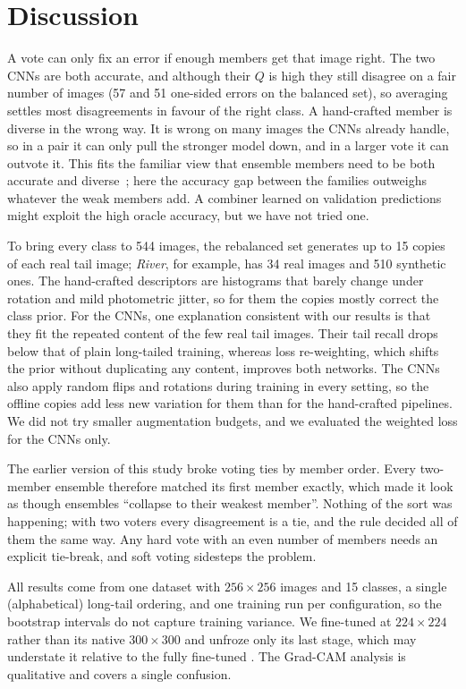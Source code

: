 \section{Discussion}
\label{sec:discussion}

A vote can only fix an error if enough members get that image right.
The two CNNs are both accurate, and although their $Q$ is high they still disagree on a fair number of images (57 and 51 one-sided errors on the balanced set), so averaging settles most disagreements in favour of the right class.
A hand-crafted member is diverse in the wrong way.
It is wrong on many images the CNNs already handle, so in a pair it can only pull the stronger model down, and in a larger vote it can outvote it.
This fits the familiar view that ensemble members need to be both accurate and diverse~\cite{dietterich2000ensemble,kuncheva2003diversity}; here the accuracy gap between the families outweighs whatever the weak members add.
A combiner learned on validation predictions might exploit the high oracle accuracy, but we have not tried one.

To bring every class to 544 images, the rebalanced set generates up to 15 copies of each real tail image; \emph{River}, for example, has 34 real images and 510 synthetic ones.
The hand-crafted descriptors are histograms that barely change under rotation and mild photometric jitter, so for them the copies mostly correct the class prior.
For the CNNs, one explanation consistent with our results is that they fit the repeated content of the few real tail images.
Their tail recall drops below that of plain long-tailed training, whereas loss re-weighting, which shifts the prior without duplicating any content, improves both networks.
The CNNs also apply random flips and rotations during training in every setting, so the offline copies add less new variation for them than for the hand-crafted pipelines.
We did not try smaller augmentation budgets, and we evaluated the weighted loss for the CNNs only.

The earlier version of this study broke voting ties by member order.
Every two-member ensemble therefore matched its first member exactly, which made it look as though ensembles ``collapse to their weakest member''.
Nothing of the sort was happening; with two voters every disagreement is a tie, and the rule decided all of them the same way.
Any hard vote with an even number of members needs an explicit tie-break, and soft voting sidesteps the problem.

All results come from one dataset with $256\times256$ images and 15 classes, a single (alphabetical) long-tail ordering, and one training run per configuration, so the bootstrap intervals do not capture training variance.
We fine-tuned \eb at $224\times224$ rather than its native $300\times300$ and unfroze only its last stage, which may understate it relative to the fully fine-tuned \rn.
The Grad-CAM analysis is qualitative and covers a single confusion.
